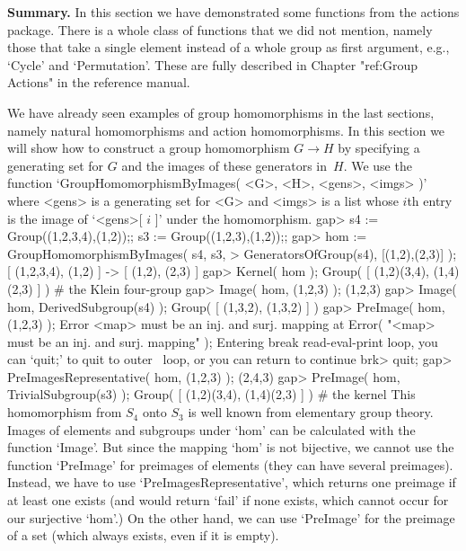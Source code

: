 {\bf  Summary.} In this section we  have demonstrated some functions from
the actions package. There  is a whole class of  functions that we did
not mention, namely  those that take a  single element instead of a whole
group as first argument, e.g., `Cycle' and `Permutation'. These are fully
described  in Chapter "ref:Group Actions"  in the  reference
manual.


We   have already  seen  examples of   group homomorphisms  in  the  last
sections,  namely natural homomorphisms  and  action homomorphisms. In
this section we will show how to construct a  group homomorphism $G\to H$
by specifying a generating set for $G$ and the images of these generators
in~$H$. We use the function `GroupHomomorphismByImages( <G>, <H>, <gens>,
<imgs> )' where <gens> is a  generating set for <G> and  <imgs> is a list
whose $i$th entry is the image of `<gens>[ $i$ ]' under the homomorphism.
\beginexample
gap> s4 := Group((1,2,3,4),(1,2));; s3 := Group((1,2,3),(1,2));;
gap> hom := GroupHomomorphismByImages( s4, s3,
>           GeneratorsOfGroup(s4), [(1,2),(2,3)] );
[ (1,2,3,4), (1,2) ] -> [ (1,2), (2,3) ]
gap> Kernel( hom );
Group( [ (1,2)(3,4), (1,4)(2,3) ] )  # the Klein four-group
gap> Image( hom, (1,2,3) );
(1,2,3)
gap> Image( hom, DerivedSubgroup(s4) );
Group( [ (1,3,2), (1,3,2) ] )
\endexample
\begintt
gap> PreImage( hom, (1,2,3) );
Error <map> must be an inj. and surj. mapping at
Error( "<map> must be an inj. and surj. mapping" );
Entering break read-eval-print loop, you can `quit;' to quit to outer \
loop,
or you can return to continue
brk> quit;
\endtt
\beginexample
gap> PreImagesRepresentative( hom, (1,2,3) );
(2,4,3)
gap> PreImage( hom, TrivialSubgroup(s3) );
Group( [ (1,2)(3,4), (1,4)(2,3) ] )  # the kernel
\endexample
This homomorphism  from $S_4$ onto  $S_3$  is well known  from elementary
group theory.  Images   of elements and  subgroups  under   `hom' can  be
calculated with the function `Image'. But since the mapping `hom' is not
bijective, we  cannot use   the   function `PreImage' for  preimages   of
elements  (they can have   several preimages). Instead,   we have  to use
`PreImagesRepresentative', which  returns  one  preimage if at    least one
exists (and would  return `fail' if none  exists, which  cannot occur for
our surjective `hom'.)  On the other hand, we  can use `PreImage' for the
preimage of a set (which always exists, even if it  is empty).

